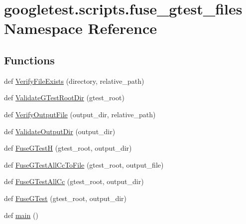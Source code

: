 \hypertarget{namespacegoogletest_1_1scripts_1_1fuse__gtest__files}{}\section{googletest.\+scripts.\+fuse\+\_\+gtest\+\_\+files Namespace Reference}
\label{namespacegoogletest_1_1scripts_1_1fuse__gtest__files}
\subsection*{Functions}
\begin{DoxyCompactItemize}
\item 
def \mbox{\hyperlink{namespacegoogletest_1_1scripts_1_1fuse__gtest__files_a48abd4ea8ab1c7c748ee060a05b6c51b}{Verify\+File\+Exists}} (directory, relative\+\_\+path)
\item 
def \mbox{\hyperlink{namespacegoogletest_1_1scripts_1_1fuse__gtest__files_a704ebbb6aeb3f0331bbd72d609752806}{Validate\+G\+Test\+Root\+Dir}} (gtest\+\_\+root)
\item 
def \mbox{\hyperlink{namespacegoogletest_1_1scripts_1_1fuse__gtest__files_ac65d4b5ec0f4ee8963255a8a21811037}{Verify\+Output\+File}} (output\+\_\+dir, relative\+\_\+path)
\item 
def \mbox{\hyperlink{namespacegoogletest_1_1scripts_1_1fuse__gtest__files_a5baad855b593c364235ad8045a3d8685}{Validate\+Output\+Dir}} (output\+\_\+dir)
\item 
def \mbox{\hyperlink{namespacegoogletest_1_1scripts_1_1fuse__gtest__files_aa5cbce61df344569a4b8c9804e978c00}{Fuse\+G\+TestH}} (gtest\+\_\+root, output\+\_\+dir)
\item 
def \mbox{\hyperlink{namespacegoogletest_1_1scripts_1_1fuse__gtest__files_a1caf7d012f1994baf00029a05a2efa1a}{Fuse\+G\+Test\+All\+Cc\+To\+File}} (gtest\+\_\+root, output\+\_\+file)
\item 
def \mbox{\hyperlink{namespacegoogletest_1_1scripts_1_1fuse__gtest__files_a590159622a53c7aa8705f8d6ece092d8}{Fuse\+G\+Test\+All\+Cc}} (gtest\+\_\+root, output\+\_\+dir)
\item 
def \mbox{\hyperlink{namespacegoogletest_1_1scripts_1_1fuse__gtest__files_a7c82d144dcaf4bcdd594f7f37cfaf03c}{Fuse\+G\+Test}} (gtest\+\_\+root, output\+\_\+dir)
\item 
def \mbox{\hyperlink{namespacegoogletest_1_1scripts_1_1fuse__gtest__files_ade0ad805b2d0c8003c2edd2951af846f}{main}} ()
\end{DoxyCompactItemize}
